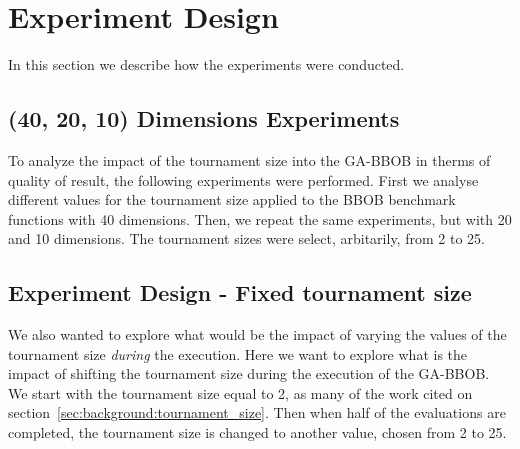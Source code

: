 \section{Experiment Design}

In this section we describe how the experiments were conducted.


\label{sec:experiment}

\subsection{(40, 20, 10) Dimensions Experiments}

To analyze the impact of the tournament size into the GA-BBOB in therms of quality of result, the following experiments were performed. First we analyse different values for the tournament size applied to the BBOB benchmark functions with 40 dimensions. Then, we repeat the same experiments, but with 20 and 10 dimensions.  The tournament sizes were select, arbitarily, from 2 to 25.


\subsection{Experiment Design - Fixed tournament size}

We also wanted to explore what would be the impact of varying the values of the tournament size \textit{during} the execution.
Here we want to explore what is the impact of shifting the tournament size during the execution of the GA-BBOB. We start with the tournament size equal to 2, as many of the work cited on section~\ref{sec:background:tournament_size}. Then when half of the evaluations are completed, the tournament size is changed to another value, chosen from 2 to 25. 


